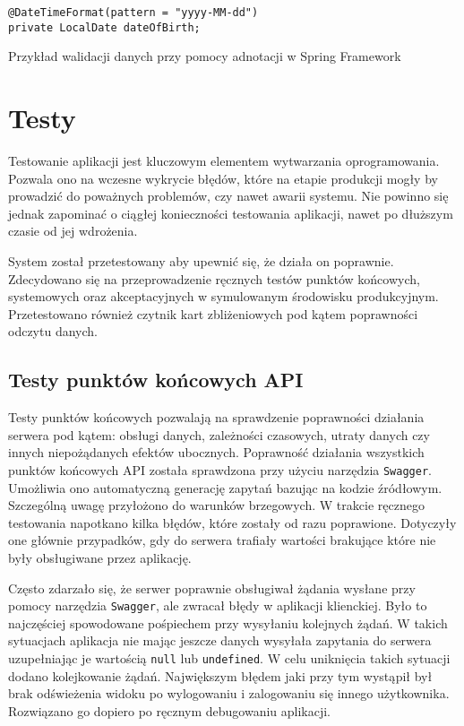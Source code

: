 \begin{listing}[H]
    \begin{verbatim}
@DateTimeFormat(pattern = "yyyy-MM-dd")
private LocalDate dateOfBirth;
\end{verbatim}
    \caption{Przykład walidacji danych przy pomocy adnotacji w Spring Framework}
    \label{lst:validation}
\end{listing}

\section{Testy}

Testowanie aplikacji jest kluczowym elementem wytwarzania oprogramowania. Pozwala ono na wczesne wykrycie błędów, które na etapie produkcji mogły by prowadzić do poważnych problemów, czy nawet awarii systemu. Nie powinno się jednak zapominać o ciągłej konieczności testowania aplikacji, nawet po dłuższym czasie od jej wdrożenia.

System został przetestowany aby upewnić się, że działa on poprawnie. Zdecydowano się na przeprowadzenie ręcznych testów punktów końcowych, systemowych oraz akceptacyjnych w symulowanym środowisku produkcyjnym. Przetestowano również czytnik kart zbliżeniowych pod kątem poprawności odczytu danych.

\subsection{Testy punktów końcowych API}

Testy punktów końcowych pozwalają na sprawdzenie poprawności działania serwera pod kątem: obsługi danych, zależności czasowych, utraty danych czy innych niepożądanych efektów ubocznych. Poprawność działania wszystkich punktów końcowych API została sprawdzona przy użyciu narzędzia \texttt{Swagger}. Umożliwia ono automatyczną generację zapytań bazując na kodzie źródłowym. Szczególną uwagę przyłożono do warunków brzegowych. W trakcie ręcznego testowania napotkano kilka błędów, które zostały od razu poprawione. Dotyczyły one głównie przypadków, gdy do serwera trafiały wartości brakujące które nie były obsługiwane przez aplikację.

Często zdarzało się, że serwer poprawnie obsługiwał żądania wysłane przy pomocy narzędzia \texttt{Swagger}, ale zwracał błędy w aplikacji klienckiej. Było to najczęściej spowodowane pośpiechem przy wysyłaniu kolejnych żądań. W takich sytuacjach aplikacja nie mając jeszcze danych wysyłała zapytania do serwera uzupełniając je wartością \texttt{null} lub \texttt{undefined}. W celu uniknięcia takich sytuacji dodano kolejkowanie żądań. Największym błędem jaki przy tym wystąpił był brak odświeżenia widoku po wylogowaniu i zalogowaniu się innego użytkownika. Rozwiązano go dopiero po ręcznym debugowaniu aplikacji.

